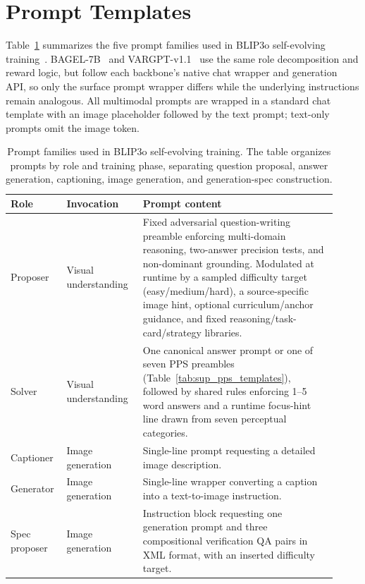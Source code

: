 \documentclass[runningheads]{llncs}
\begin{document}
\section{Prompt Templates}
\label{sec:sup_prompts}

Table~\ref{tab:sup_prompt_families} summarizes the five prompt families used in BLIP3o self-evolving training~\cite{chen2025blip3o}. BAGEL-7B~\cite{deng2025bagel} and VARGPT-v1.1~\cite{zhuang2025vargpt} use the same role decomposition and reward logic, but follow each backbone's native chat wrapper and generation API, so only the surface prompt wrapper differs while the underlying instructions remain analogous. All multimodal prompts are wrapped in a standard chat template with an image placeholder followed by the text prompt; text-only prompts omit the image token.

\begin{table}[!htb]
  \centering
  \small
  \setlength{\tabcolsep}{4pt}
  \renewcommand{\arraystretch}{1.12}
  \caption{Prompt families used in BLIP3o self-evolving training. The table organizes prompts by role and training phase, separating question proposal, answer generation, captioning, image generation, and generation-spec construction.}
  \label{tab:sup_prompt_families}
  \begin{tabular}{@{}p{0.13\linewidth}p{0.22\linewidth}p{0.57\linewidth}@{}}
    \toprule
    Role & Invocation & Prompt content \\
    \midrule
    Proposer & Visual understanding & Fixed adversarial question-writing preamble enforcing multi-domain reasoning, two-answer precision tests, and non-dominant grounding. Modulated at runtime by a sampled difficulty target (easy/medium/hard), a source-specific image hint, optional curriculum/anchor guidance, and fixed reasoning/task-card/strategy libraries. \\
    Solver & Visual understanding & One canonical answer prompt or one of seven PPS preambles (Table~\ref{tab:sup_pps_templates}), followed by shared rules enforcing 1--5 word answers and a runtime focus-hint line drawn from seven perceptual categories. \\
    Captioner & Image generation & Single-line prompt requesting a detailed image description. \\
    Generator & Image generation & Single-line wrapper converting a caption into a text-to-image instruction. \\
    Spec proposer & Image generation & Instruction block requesting one generation prompt and three compositional verification QA pairs in XML format, with an inserted difficulty target. \\
    \bottomrule
  \end{tabular}
\end{table}
\end{document}
